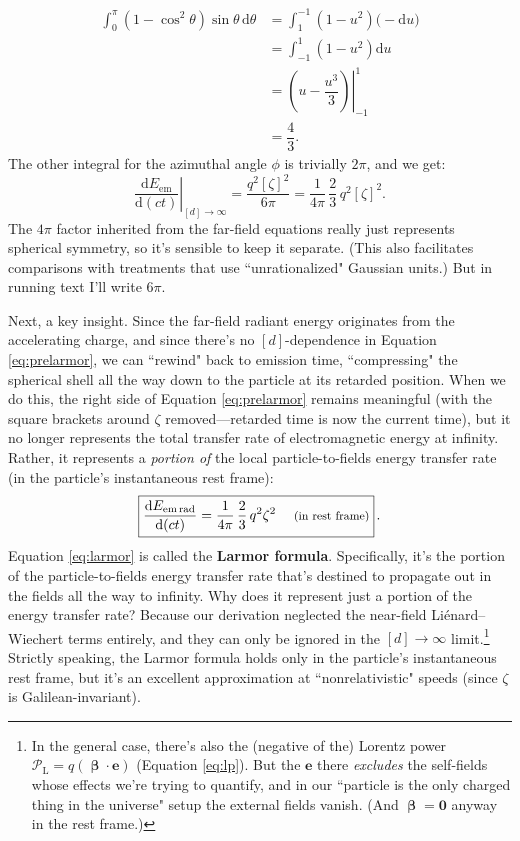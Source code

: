\documentclass[12pt]{article}
\renewcommand{\vv}[1]{\mathbf{#1}}
\newcommand{\dd}[1]{\mathrm{d}#1}
\newcommand{\vvbeta}{\bm{\upbeta}}
\begin{document}
\begin{equation*}
\begin{aligned}
\int_{0}^{\pi} \left( 1 - \cos^2 \theta \right) \sin \theta \, \dd \theta &= \int_{1}^{-1} \left( 1 - u^2 \right) \big( - \dd u \big) \\[3pt]
&= \int_{-1}^{1} \left( 1 - u^2 \right) \dd u \\[2pt]
&=  \left. \left( u - \dfrac{u^3}{3} \right) \right|_{-1}^{1} \\[1pt]
&= \dfrac{4}{3} .
\end{aligned}
\end{equation*}
The other integral for the azimuthal angle $\phi$ is trivially $2 \pi$, and we get:
\begin{equation}\label{eq:prelarmor}
\left. \dfrac{\dd E_{\textrm{em}}}{\dd (ct)} \right|_{[d] \rightarrow \infty} = \dfrac{q^2 [\zeta]^2}{6 \pi} = \dfrac{1}{4\pi} \, \dfrac{2}{3} \, q^2 [\zeta]^2 .
\end{equation}
The $4 \pi$ factor inherited from the far-field equations really just represents spherical symmetry, so it's sensible to keep it separate. (This also facilitates comparisons with treatments that use ``unrationalized" Gaussian units.) But in running text I'll write $6 \pi$.

Next, a key insight. Since the far-field radiant energy originates from the accelerating charge, and since there's no $[d]$-dependence in Equation \ref{eq:prelarmor}, we can ``rewind" back to emission time, ``compressing" the spherical shell all the way down to the particle at its retarded position. When we do this, the right side of Equation \ref{eq:prelarmor} remains meaningful (with the square brackets around $\zeta$ removed---retarded time is now the current time), but it no longer represents the total transfer rate of electromagnetic energy at infinity. Rather, it represents a \emph{portion of} the local particle-to-fields energy transfer rate (in the particle's instantaneous rest frame):
\begin{equation}\label{eq:larmor}
\boxed{ \dfrac{\dd E_{\textrm{em} \, \textrm{rad}}}{\dd (ct)} = \dfrac{1}{4\pi} \, \dfrac{2}{3} \, q^2 \zeta^2 \quad \text{\footnotesize{ (in rest frame)}} } \, .
\end{equation}
Equation \ref{eq:larmor} is called the \textbf{Larmor formula}. Specifically, it's the portion of the particle-to-fields energy transfer rate that's destined to propagate out in the fields all the way to infinity. Why does it represent just a portion of the energy transfer rate? Because our derivation neglected the near-field Li\'enard--Wiechert terms entirely, and they can only be ignored in the ${[d] \rightarrow \infty}$ limit.\footnote{In the general case, there's also the (negative of the) Lorentz power $\mathcal{P}_{\textrm{L}} = q ( \vvbeta \cdot \vv e )$ (Equation \ref{eq:lp}). But the $\vv e$ there \emph{excludes} the self-fields whose effects we're trying to quantify, and in our ``particle is the only charged thing in the universe" setup the external fields vanish. (And $\vvbeta = \vv 0$ anyway in the rest frame.)} Strictly speaking, the Larmor formula holds only in the particle's instantaneous rest frame, but it's an excellent approximation at ``nonrelativistic" speeds (since $\zeta$ is Galilean-invariant).
\end{document}
